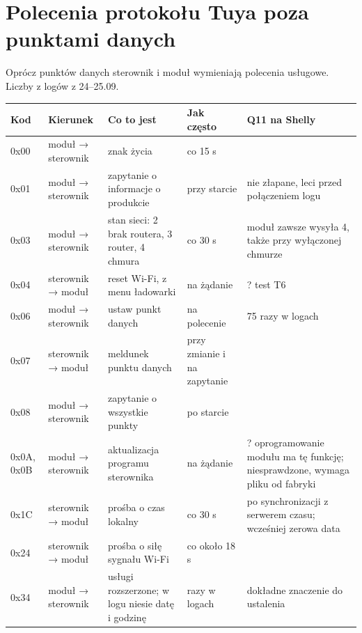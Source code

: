 \documentclass[11pt,a4paper]{article}
\begin{document}
\section{Polecenia protokołu Tuya poza punktami danych}

Oprócz punktów danych sterownik i moduł wymieniają polecenia usługowe. Liczby z logów z 24–25.09.


\begin{longtable}{>{\raggedright\arraybackslash}p{3.00cm}>{\raggedright\arraybackslash}p{2.29cm}>{\raggedright\arraybackslash}p{3.82cm}>{\raggedright\arraybackslash}p{1.66cm}>{\raggedright\arraybackslash}p{3.63cm}}
\toprule
\rowcolor{apteallight}\textbf{Kod} & \textbf{Kierunek} & \textbf{Co to jest} & \textbf{Jak często} & \textbf{Q11 na Shelly} \\
\midrule\endhead
\bottomrule\endfoot
0x00 & moduł {\symbolfont→} sterownik & znak życia & co 15 s & \leavevmode{\symbolfont\color{apgreen}\textbf{✔}} \\
0x01 & moduł {\symbolfont→} sterownik & zapytanie o informacje o produkcie & przy starcie & \leavevmode{\symbolfont\color{apamber}\textbf{◐}} nie złapane, leci przed połączeniem logu \\
0x03 & moduł {\symbolfont→} sterownik & stan sieci: 2 brak routera, 3 router, 4 chmura & co 30 s & \leavevmode{\symbolfont\color{apamber}\textbf{◐}} moduł zawsze wysyła 4, także przy wyłączonej chmurze \\
0x04 & sterownik {\symbolfont→} moduł & reset Wi-Fi, z menu ładowarki & na żądanie & ? test T6 \\
0x06 & moduł {\symbolfont→} sterownik & ustaw punkt danych & na polecenie & \leavevmode{\symbolfont\color{apgreen}\textbf{✔}} 75 razy w logach \\
0x07 & sterownik {\symbolfont→} moduł & meldunek punktu danych & przy zmianie i na zapytanie & \leavevmode{\symbolfont\color{apgreen}\textbf{✔}} \\
0x08 & moduł {\symbolfont→} sterownik & zapytanie o wszystkie punkty & po starcie & \leavevmode{\symbolfont\color{apgreen}\textbf{✔}} \\
0x0A, 0x0B & moduł {\symbolfont→} sterownik & aktualizacja programu sterownika & na żądanie & ? oprogramowanie modułu ma tę funkcję; niesprawdzone, wymaga pliku od fabryki \\
0x1C & sterownik {\symbolfont→} moduł & prośba o czas lokalny & co 30 s & \leavevmode{\symbolfont\color{apgreen}\textbf{✔}} po synchronizacji z serwerem czasu; wcześniej zerowa data \\
0x24 & sterownik {\symbolfont→} moduł & prośba o siłę sygnału Wi-Fi & co około 18 s & \leavevmode{\symbolfont\color{apgreen}\textbf{✔}} \\
0x34 & moduł {\symbolfont→} sterownik & usługi rozszerzone; w logu niesie datę i godzinę & 41 razy w logach & \leavevmode{\symbolfont\color{apamber}\textbf{◐}} dokładne znaczenie do ustalenia \\
\end{longtable}
\end{document}
